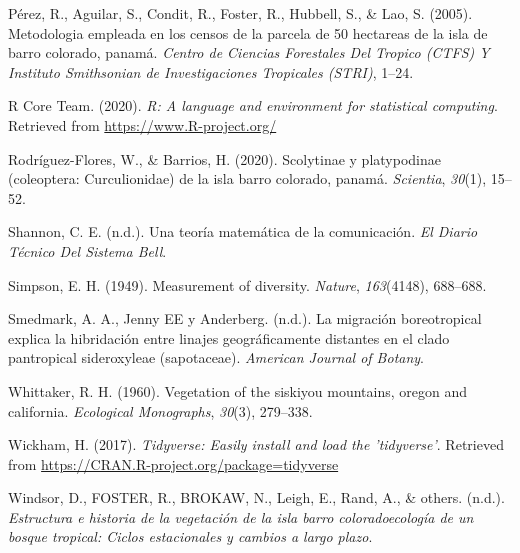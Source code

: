 \documentclass[11pt,]{article}
\begin{document}
\hypertarget{ref-perez2005metodologia}{}
Pérez, R., Aguilar, S., Condit, R., Foster, R., Hubbell, S., \& Lao, S.
(2005). Metodologia empleada en los censos de la parcela de 50 hectareas
de la isla de barro colorado, panamá. \emph{Centro de Ciencias
Forestales Del Tropico (CTFS) Y Instituto Smithsonian de Investigaciones
Tropicales (STRI)}, 1--24.

\hypertarget{ref-Restudio}{}
R Core Team. (2020). \emph{R: A language and environment for statistical
computing}. Retrieved from \url{https://www.R-project.org/}

\hypertarget{ref-rodriguez2020scolytinae}{}
Rodríguez-Flores, W., \& Barrios, H. (2020). Scolytinae y platypodinae
(coleoptera: Curculionidae) de la isla barro colorado, panamá.
\emph{Scientia}, \emph{30}(1), 15--52.

\hypertarget{ref-shannon1948mathematical}{}
Shannon, C. E. (n.d.). Una teoría matemática de la comunicación.
\emph{El Diario Técnico Del Sistema Bell}.

\hypertarget{ref-simpson1949measurement}{}
Simpson, E. H. (1949). Measurement of diversity. \emph{Nature},
\emph{163}(4148), 688--688.

\hypertarget{ref-smedmark2007boreotropical}{}
Smedmark, A. A., Jenny EE y Anderberg. (n.d.). La migración
boreotropical explica la hibridación entre linajes geográficamente
distantes en el clado pantropical sideroxyleae (sapotaceae).
\emph{American Journal of Botany}.

\hypertarget{ref-whittaker1960vegetation}{}
Whittaker, R. H. (1960). Vegetation of the siskiyou mountains, oregon
and california. \emph{Ecological Monographs}, \emph{30}(3), 279--338.

\hypertarget{ref-tidyverse}{}
Wickham, H. (2017). \emph{Tidyverse: Easily install and load the
'tidyverse'}. Retrieved from
\url{https://CRAN.R-project.org/package=tidyverse}

\hypertarget{ref-windsorestructura}{}
Windsor, D., FOSTER, R., BROKAW, N., Leigh, E., Rand, A., \& others.
(n.d.). \emph{Estructura e historia de la vegetación de la isla barro
coloradoecología de un bosque tropical: Ciclos estacionales y cambios a
largo plazo}.




\newpage
\singlespacing 
\end{document}
